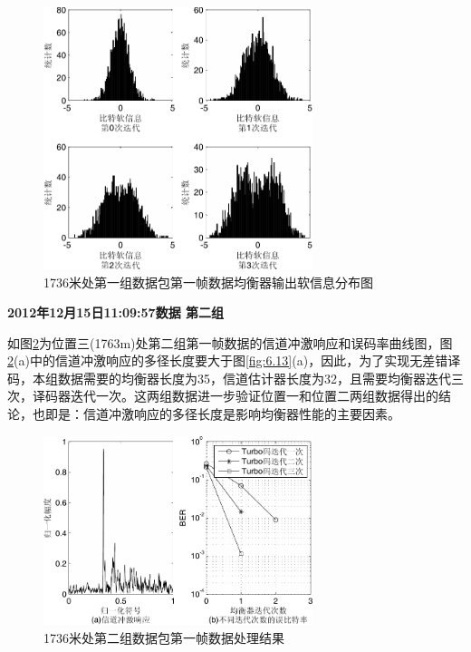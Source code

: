 \begin{figure}[htb]
  \begin{center}
    \includegraphics[width=0.7\textwidth]{images/softInfo_3_1.pdf}
  \end{center}
  \caption{1736米处第一组数据包第一帧数据均衡器输出软信息分布图}
  \label{fig:6.13s}
\end{figure}
\textbf{\sihao 2012年12月15日11:09:57数据 第二组} 

如图\ref{fig:6.14}为位置三(1763m)处第二组第一帧数据的信道冲激响应和误码率曲线图，图\ref{fig:6.14}(a)中的信道冲激响应的多径长度要大于图\ref{fig:6.13}(a)，因此，为了实现无差错译码，本组数据需要的均衡器长度为35，信道估计器长度为32，且需要均衡器迭代三次，译码器迭代一次。这两组数据进一步验证位置一和位置二两组数据得出的结论，也即是：信道冲激响应的多径长度是影响均衡器性能的主要因素。

\begin{figure}[htb]
  \begin{center}
    \includegraphics[width=0.7\textwidth]{images/result_3_2_s.pdf}
  \end{center}
  \caption{1736米处第二组数据包第一帧数据处理结果}
  \label{fig:6.14}
\end{figure}

